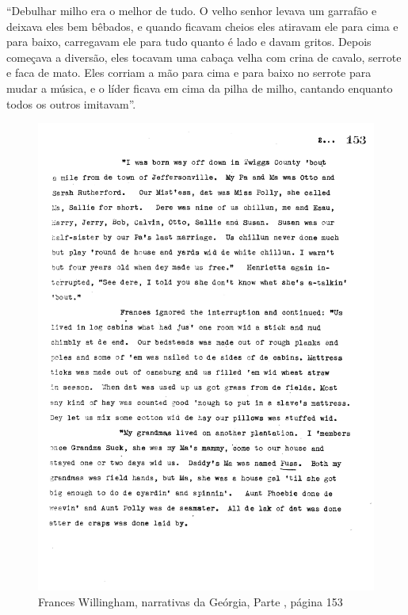 ``Debulhar milho era o melhor de tudo. O velho senhor levava um garrafão
e deixava eles bem bêbados, e quando ficavam cheios eles atiravam ele
para cima e para baixo, carregavam ele para tudo quanto é lado e davam
gritos. Depois começava a diversão, eles tocavam uma cabaça velha com
crina de cavalo, serrote e faca de mato. Eles corriam a mão para cima e
para baixo no serrote para mudar a música, e o líder ficava em cima da
pilha de milho, cantando enquanto todos os outros imitavam''.

\pagebreak
\thispagestyle{empty}

\movetoevenpage
\thispagestyle{empty}
\begin{absolutelynopagebreak}
\begin{vplace}
\begin{figure}[H]
\begin{adjustwidth}{-1.8cm}{}
  \vspace*{-2cm}
  \includegraphics[width=133mm]{./imgs/Cap2.jpg}  
\end{adjustwidth}
  \caption{Frances Willingham, narrativas da Geórgia, Parte , página 153}
\end{figure}
\end{vplace}

\end{absolutelynopagebreak}

